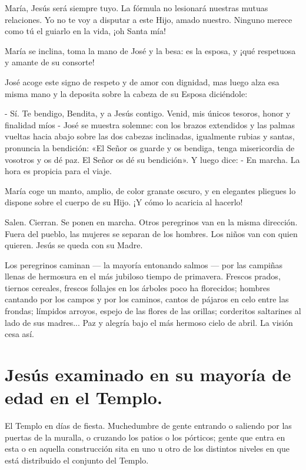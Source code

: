 \documentclass[12pt, twoside, openright]{book} %
\begin{document}
María, Jesús será siempre tuyo. La fórmula no lesionará nuestras mutuas relaciones. Yo no te voy a disputar a este Hijo, amado nuestro. Ninguno merece como tú el guiarlo en la vida, ¡oh Santa mía! 

María se inclina, toma la mano de José y la besa: es la esposa, y ¡qué respetuosa y amante de su consorte! 

José acoge este signo de respeto y de amor con dignidad, mas luego alza esa misma mano y la deposita sobre la cabeza de su Esposa diciéndole: 

- Sí. Te bendigo, Bendita, y a Jesús contigo. Venid, mis únicos tesoros, honor y finalidad míos - José se muestra solemne: con los brazos extendidos y las palmas vueltas hacia abajo sobre las dos cabezas inclinadas, igualmente rubias y santas, pronuncia la bendición: «El Señor os guarde y os bendiga, tenga misericordia de vosotros y os dé paz. El Señor os dé su bendición». Y luego dice: - En marcha. La hora es propicia para el viaje. 

María coge un manto, amplio, de color granate oscuro, y en elegantes pliegues lo dispone sobre el cuerpo de su Hijo. ¡Y cómo lo acaricia al hacerlo! 

Salen. Cierran. Se ponen en marcha. Otros peregrinos van en la misma dirección. Fuera del pueblo, las mujeres se separan de los hombres. Los niños van con quien quieren. Jesús se queda con su Madre. 

Los peregrinos caminan — la mayoría entonando salmos — por las campiñas llenas de hermosura en el más jubiloso tiempo de primavera. Frescos prados, tiernos cereales, frescos follajes en los árboles poco ha florecidos; hombres cantando por los campos y por los caminos, cantos de pájaros en celo entre las frondas; límpidos arroyos, espejo de las flores de las orillas; corderitos saltarines al lado de sus madres... Paz y alegría bajo el más hermoso cielo de abril. La visión cesa así. 

\chapter*{Jesús examinado en su mayoría de edad en el Templo.}
 
El Templo en días de fiesta. Muchedumbre de gente entrando o saliendo por las puertas de la muralla, o cruzando los patios o los pórticos; gente que entra en esta o en aquella construcción sita en uno u otro de los distintos niveles en que está distribuido el conjunto del Templo. 
\end{document}
